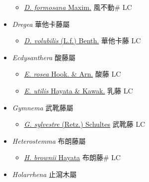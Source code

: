\begin{itemize}
  \begin{itemize}
        \item[] \href{http://www.theplantlist.org/tpl1.1/search?q=Dischidia+formosana}{\textit{D. formosana} Maxim.}   風不動\# LC
  \end{itemize}
 \item[] \textit{Dregea} 華他卡藤屬
                    
  \begin{itemize}
        \item[] \href{http://www.theplantlist.org/tpl1.1/search?q=Dregea+volubilis}{\textit{D. volubilis} (L.f.) Benth.}   華他卡藤 LC
  \end{itemize}
 \item[] \textit{Ecdysanthera} 酸藤屬
                    
  \begin{itemize}
        \item[] \href{http://www.theplantlist.org/tpl1.1/search?q=Ecdysanthera+rosea}{\textit{E. rosea} Hook. \& Arn.}   酸藤 LC
        \item[] \href{http://www.theplantlist.org/tpl1.1/search?q=Ecdysanthera+utilis}{\textit{E. utilis} Hayata \& Kawak.}   乳藤 LC
  \end{itemize}
 \item[] \textit{Gymnema} 武靴藤屬
                    
  \begin{itemize}
        \item[] \href{http://www.theplantlist.org/tpl1.1/search?q=Gymnema+sylvestre}{\textit{G. sylvestre} (Retz.) Schultes}   武靴藤 LC
  \end{itemize}
 \item[] \textit{Heterostemma} 布朗藤屬
                    
  \begin{itemize}
        \item[] \href{http://www.theplantlist.org/tpl1.1/search?q=Heterostemma+brownii}{\textit{H. brownii} Hayata}   布朗藤\# LC
  \end{itemize}
 \item[] \textit{Holarrhena} 止瀉木屬
                    

\end{itemize}
